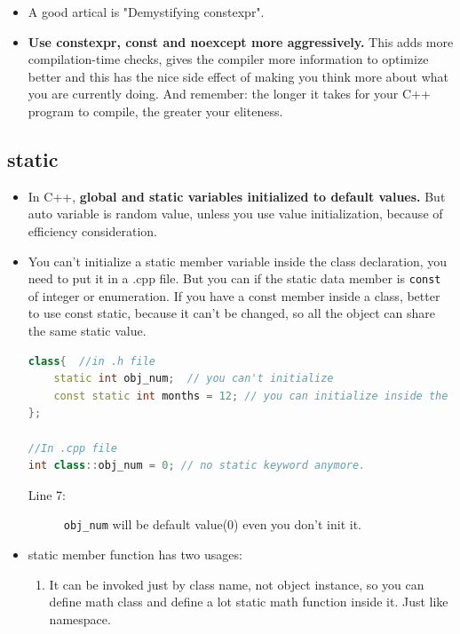 \documentclass[a4paper,11pt,twoside]{book}
\begin{document}
\begin{itemize}
	\item A good artical is "Demystifying constexpr". 
	
	\item \textbf{Use constexpr, const and noexcept more aggressively.} This adds more compilation-time checks, gives the compiler more information to optimize better and this has the nice side effect of making you think more about what you are currently doing. And remember: the longer it takes for your C++ program to compile, the greater your eliteness.
\end{itemize}

\subsection{static}
\begin{itemize}
	\item In C++, \textbf{global and static variables initialized to default values.}  But auto variable is random value, unless you use value initialization, because of efficiency consideration. 
	
	\item You can't initialize a static member variable inside the class declaration, you need to put it in a .cpp file.   But you can if the static data member is \texttt{const} of integer or enumeration. If you have a const member inside a class, better to use const static, because it can't be changed, so all the object can share the same static value.
\begin{lstlisting}[frame=single, language=c++]
class{  //in .h file
	static int obj_num;  // you can't initialize
	const static int months = 12; // you can initialize inside the class
};
	
//In .cpp file
int class::obj_num = 0; // no static keyword anymore.

\end{lstlisting}
\begin{description}
	\item[Line 7:] \texttt{obj\_num} will be default value(0) even you don't init it.
\end{description}
	
	\item static member function has two usages:
	\begin{enumerate}
		\item It can be invoked just by class name, not object instance, so you can define math class and define a lot static math function inside it.  Just like namespace.
		

\end{enumerate}
\end{itemize}
\end{document}
